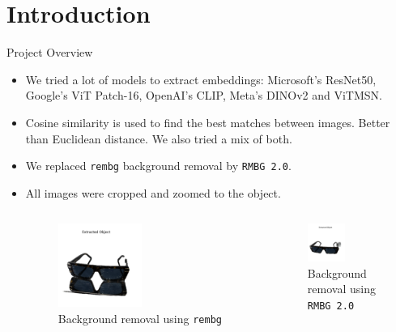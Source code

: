 \documentclass{beamer}
\begin{document}
\section{Introduction}
\begin{frame}{Project Overview}
\begin{itemize}
    \item We tried a lot of models to extract embeddings: Microsoft's ResNet50, Google's ViT Patch-16, OpenAI's CLIP, Meta's DINOv2 and ViTMSN.
    \item Cosine similarity is used to find the best matches between images. Better than Euclidean distance. We also tried a mix of both.
    \item We replaced \texttt{rembg} background removal by \texttt{RMBG 2.0}.
    \item All images were cropped and zoomed to the object.
    \begin{columns}
        \begin{figure}
            \includegraphics[width=0.5\textwidth]{assets/glasses_rembg.png}
            \caption{Background removal using \texttt{rembg}}
        \end{figure}
        \begin{figure}
            \includegraphics[width=0.5\textwidth]{assets/glasses_rmbg_2.png}
            \caption{Background removal using \texttt{RMBG 2.0}}
        \end{figure}
    \end{columns}
\end{itemize}
\end{frame}
\end{document}
